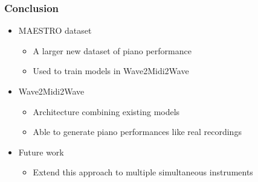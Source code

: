 \documentclass[dvipdfmx]{beamer}
\begin{document}
\begin{frame}
    \frametitle{Conclusion}
    \begin{itemize}
        \item MAESTRO dataset
        \begin{itemize}
            \item A larger new dataset of piano performance
            \item Used to train models in Wave2Midi2Wave
        \end{itemize}
    \end{itemize}
    \begin{itemize}
        \item Wave2Midi2Wave
        \begin{itemize}
            \item Architecture combining existing models
            \item Able to generate piano performances like real recordings
        \end{itemize}
    \end{itemize}
    \begin{itemize}
        \item Future work
        \begin{itemize}
            \item Extend this approach to multiple simultaneous instruments
        \end{itemize}
    \end{itemize}
\end{frame}


{\footnotesize
}
\end{document}

